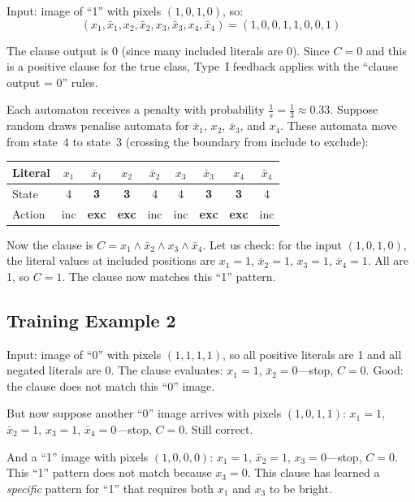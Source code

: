 Input: image of ``1'' with pixels $(1, 0, 1, 0)$, so:
\[
  (x_1, \bar{x}_1, x_2, \bar{x}_2, x_3, \bar{x}_3, x_4, \bar{x}_4)
  = (1, 0, 0, 1, 1, 0, 0, 1)
\]

The clause output is 0 (since many included literals are 0). Since
$C = 0$ and this is a positive clause for the true class, Type~I
feedback applies with the ``clause output = 0'' rules.

Each automaton receives a penalty with probability $\frac{1}{s} =
\frac{1}{3} \approx 0.33$. Suppose random draws penalise automata
for $\bar{x}_1$, $x_2$, $\bar{x}_3$, and $x_4$. These automata
move from state~4 to state~3 (crossing the boundary from include to
exclude):

\begin{center}
\begin{tabular}{@{}l*{8}{c}@{}}
  \toprule
  \textbf{Literal} & $x_1$ & $\bar{x}_1$ & $x_2$ & $\bar{x}_2$ &
    $x_3$ & $\bar{x}_3$ & $x_4$ & $\bar{x}_4$ \\
  \midrule
  State & 4 & \textbf{3} & \textbf{3} & 4 & 4 & \textbf{3} & \textbf{3} & 4 \\
  Action & inc & \textbf{exc} & \textbf{exc} & inc & inc & \textbf{exc} & \textbf{exc} & inc \\
  \bottomrule
\end{tabular}
\end{center}

Now the clause is $C = x_1 \wedge \bar{x}_2 \wedge x_3 \wedge
\bar{x}_4$. Let us check: for the input $(1, 0, 1, 0)$, the literal
values at included positions are $x_1 = 1$, $\bar{x}_2 = 1$,
$x_3 = 1$, $\bar{x}_4 = 1$. All are 1, so $C = 1$. The clause
now matches this ``1'' pattern.

\subsection{Training Example 2}

Input: image of ``0'' with pixels $(1, 1, 1, 1)$, so all positive
literals are 1 and all negated literals are 0. The clause evaluates:
$x_1 = 1$, $\bar{x}_2 = 0$---stop, $C = 0$. Good: the clause does
not match this ``0'' image.

But now suppose another ``0'' image arrives with pixels $(1, 0, 1, 1)$:
$x_1 = 1$, $\bar{x}_2 = 1$, $x_3 = 1$, $\bar{x}_4 = 0$---stop,
$C = 0$. Still correct.

And a ``1'' image with pixels $(1, 0, 0, 0)$:
$x_1 = 1$, $\bar{x}_2 = 1$, $x_3 = 0$---stop, $C = 0$. This ``1''
pattern does not match because $x_3 = 0$. This clause has learned a
\emph{specific} pattern for ``1'' that requires both $x_1$ and $x_3$
to be bright.

